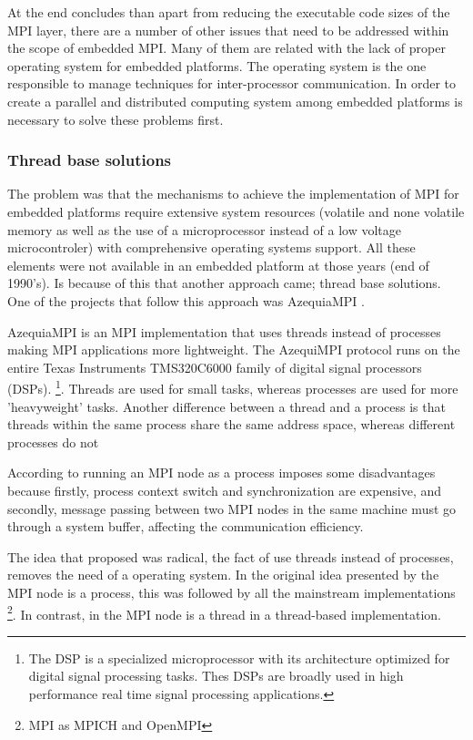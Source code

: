 At the end \cite{McMahon} concludes than apart from  reducing the executable
code sizes of the MPI layer, there are a number of other issues that need
to be addressed within the scope of embedded MPI. Many of them are related with
the lack of proper operating system for embedded platforms. The operating
system is the one responsible to manage techniques for inter-processor
communication.  In order to create a parallel and distributed computing system
among embedded platforms is necessary to solve these problems first.


\subsubsection{Thread base solutions}

The problem was that the mechanisms to achieve the implementation of MPI for
embedded platforms require extensive system resources (volatile and none
volatile memory as well as the use of a microprocessor instead of a low voltage
microcontroler) with comprehensive operating systems support. All these
elements were not available in an embedded platform at those years (end of
1990's). Is because of this that another approach came; thread base solutions.
One of the projects that follow this approach was AzequiaMPI \cite{Gallego}.

AzequiaMPI is an MPI implementation that uses threads instead of processes
making MPI applications more lightweight. The AzequiMPI protocol runs on the
entire Texas Instruments TMS320C6000 family of digital signal processors
(DSPs). \footnote{The DSP is a specialized microprocessor
with its architecture optimized for digital signal processing tasks. Thes DSPs
are broadly used in high performance real time signal processing
applications.}. Threads are used for small tasks, whereas processes are used
for more 'heavyweight' tasks. Another
difference between a thread and a process is that threads within the same
process share the same address space, whereas different processes do not

According to \cite{Gallego} running an MPI node as a process imposes some
disadvantages because firstly, process context switch and synchronization are
expensive, and secondly, message passing between two MPI nodes in the same
machine must go through a system buffer, affecting  the communication
efficiency. 

The idea that \cite{Gallego} proposed was radical, the fact of use threads
instead of processes, removes the need of a operating system. In the original
idea presented by \cite{Salim} the MPI node  is a process, this was followed by
all the mainstream implementations \footnote{MPI as MPICH and OpenMPI}. In
contrast, in \cite{Gallego} the MPI node is a thread in a thread-based
implementation.

